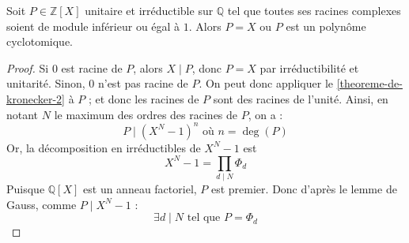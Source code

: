   \begin{corollary}
    Soit $P \in \mathbb{Z}[X]$ unitaire et irréductible sur $\mathbb{Q}$ tel que toutes ses racines complexes soient de module inférieur ou égal à $1$. Alors $P = X$ ou $P$ est un polynôme cyclotomique.
  \end{corollary}

  \begin{proof}
    Si $0$ est racine de $P$, alors $X \mid P$, donc $P = X$ par irréductibilité et unitarité. Sinon, $0$ n'est pas racine de $P$. On peut donc appliquer le \cref{theoreme-de-kronecker-2} à $P$ ; et donc les racines de $P$ sont des racines de l'unité. Ainsi, en notant $N$ le maximum des ordres des racines de $P$, on a :
    \[ P \mid (X^N - 1)^n \text{ où } n = \deg(P) \]
    Or, la décomposition en irréductibles de $X^N - 1$ est
    \[ X^N - 1 = \prod_{d \mid N} \Phi_d \]
    Puisque $\mathbb{Q}[X]$ est un anneau factoriel, $P$ est premier. Donc d'après le lemme de Gauss, comme $P \mid X^N - 1$ :
    \[ \exists d \mid N \text{ tel que } P = \Phi_d \]
  \end{proof}

